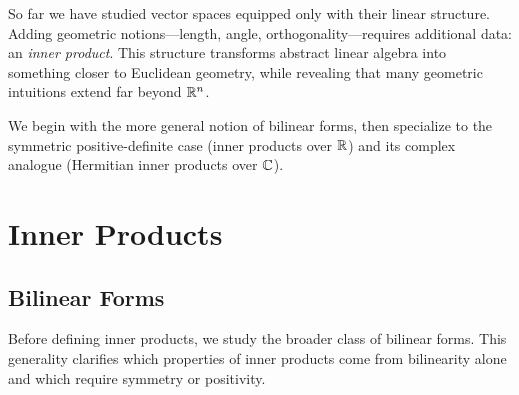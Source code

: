 \documentclass{report}
\begin{document}

So far we have studied vector spaces equipped only with their linear structure. Adding geometric notions---length, angle, orthogonality---requires additional data: an \emph{inner product}. This structure transforms abstract linear algebra into something closer to Euclidean geometry, while revealing that many geometric intuitions extend far beyond \(\RR^n\).

We begin with the more general notion of bilinear forms, then specialize to the symmetric positive-definite case (inner products over \(\RR\)) and its complex analogue (Hermitian inner products over \(\CC\)).


\section{Inner Products}

\subsection{Bilinear Forms}

Before defining inner products, we study the broader class of bilinear forms. This generality clarifies which properties of inner products come from bilinearity alone and which require symmetry or positivity.


\end{document}
